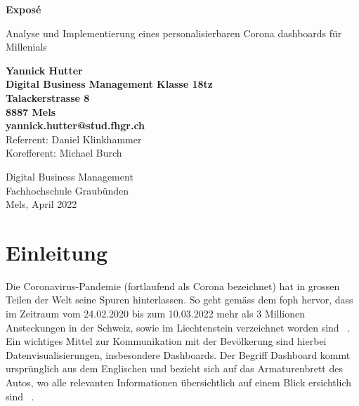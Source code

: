 \documentclass[12pt, oneside]{article}
\begin{document}
\begin{titlepage}
	\begin{center}
		\Huge
		\textbf{Exposé}
		
		\vspace{0.5cm}
		\LARGE
		Analyse und Implementierung eines personalisierbaren Corona dashboards für Millenials
		
		\vspace{1.5cm}
		\normalsize
		\textbf{Yannick Hutter}\\
		\textbf{Digital Business Management Klasse 18tz}\\
		\textbf{Talackerstrasse 8}\\
		\textbf{8887 Mels}\\
		\textbf{yannick.hutter@stud.fhgr.ch}\\

		
		\vfill
		Referrent: Daniel Klinkhammer\\
		Korefferent: Michael Burch\\
		
		\vspace{0.8cm}
		
		
		Digital Business Management\\
		Fachhochschule Graubünden\\
		Mels, April 2022
	\end{center}
\end{titlepage}



\tableofcontents
\listoffigures
\listoftables

\clearpage
\printglossaries



\clearpage
{}
\setcounter{page}{3}

\section{Einleitung}
Die Coronavirus-Pandemie (fortlaufend als Corona bezeichnet) hat in grossen Teilen der Welt seine Spuren hinterlassen. So geht gemäss dem \Gls{foph} hervor, dass im Zeitraum vom 24.02.2020 bis zum 10.03.2022 mehr als 3 Millionen Ansteckungen in der Schweiz, sowie im Liechtenstein verzeichnet worden sind ~\citep{FOPH.13.03.2022}. Ein wichtiges Mittel zur Kommunikation mit der Bevölkerung sind hierbei Datenvisualisierungen, insbesondere Dashboards.
Der Begriff Dashboard kommt ursprünglich aus dem Englischen und bezieht sich auf das Armaturenbrett des Autos, wo alle relevanten Informationen übersichtlich auf einem Blick ersichtlich sind ~\citep{Duden.18.04.2022}.\\
\end{document}
